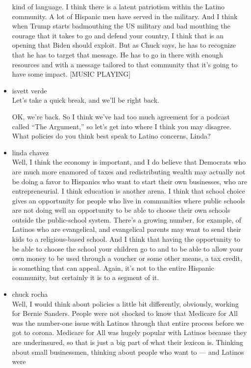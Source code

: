 \begin{itemize}
  kind of language. I think there is a latent patriotism within the
  Latino community. A lot of Hispanic men have served in the military.
  And I think when Trump starts badmouthing the US military and bad
  mouthing the courage that it takes to go and defend your country, I
  think that is an opening that Biden should exploit. But as Chuck says,
  he has to recognize that he has to target that message. He has to go
  in there with enough resources and with a message tailored to that
  community that it's going to have some impact. {[}MUSIC PLAYING{]}
\item
  isvett verde\\
  Let's take a quick break, and we'll be right back.

  OK, we're back. So I think we've had too much agreement for a podcast
  called ``The Argument,'' so let's get into where I think you may
  disagree. What policies do you think best speak to Latino concerns,
  Linda?
\item
  linda chavez\\
  Well, I think the economy is important, and I do believe that
  Democrats who are much more enamored of taxes and redistributing
  wealth may actually not be doing a favor to Hispanics who want to
  start their own businesses, who are entrepreneurial. I think education
  is another arena. I think that school choice gives an opportunity for
  people who live in communities where public schools are not doing well
  an opportunity to be able to choose their own schools outside the
  public-school system. There's a growing number, for example, of
  Latinos who are evangelical, and evangelical parents may want to send
  their kids to a religious-based school. And I think that having the
  opportunity to be able to choose the school your children go to and to
  be able to allow your own money to be used through a voucher or some
  other means, a tax credit, is something that can appeal. Again, it's
  not to the entire Hispanic community, but certainly it is to a segment
  of it.
\item
  chuck rocha\\
  Well, I would think about policies a little bit differently,
  obviously, working for Bernie Sanders. People were not shocked to know
  that Medicare for All was the number-one issue with Latinos through
  that entire process before we got to corona. Medicare for All was
  hugely popular with Latinos because they are underinsured, so that is
  just a big part of what their lexicon is. Thinking about small
  businessmen, thinking about people who want to --- and Latinos were

\end{itemize}
